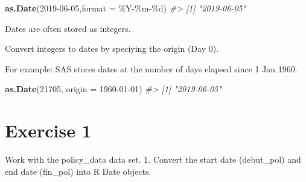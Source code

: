 \documentclass[
]{book}
\newenvironment{Shaded}{\begin{snugshade}}{\end{snugshade}}
\newcommand{\AttributeTok}[1]{\textcolor[rgb]{0.13,0.29,0.53}{#1}}
\newcommand{\CommentTok}[1]{\textcolor[rgb]{0.56,0.35,0.01}{\textit{#1}}}
\newcommand{\DecValTok}[1]{\textcolor[rgb]{0.00,0.00,0.81}{#1}}
\newcommand{\FunctionTok}[1]{\textcolor[rgb]{0.13,0.29,0.53}{\textbf{#1}}}
\newcommand{\NormalTok}[1]{#1}
\newcommand{\StringTok}[1]{\textcolor[rgb]{0.31,0.60,0.02}{#1}}
\begin{document}
\begin{Shaded}
\begin{Highlighting}[]
\FunctionTok{as.Date}\NormalTok{(}\StringTok{\textquotesingle{}2019{-}06{-}05\textquotesingle{}}\NormalTok{,}\AttributeTok{format =} \StringTok{\textquotesingle{}\%Y{-}\%m{-}\%d\textquotesingle{}}\NormalTok{)}
\CommentTok{\#\textgreater{} [1] "2019{-}06{-}05"}
\end{Highlighting}
\end{Shaded}

Dates are often stored as integers.

Convert integers to dates by speciying the origin (Day 0).

For example: SAS stores dates at the number of days elapsed since 1 Jan 1960.

\begin{Shaded}
\begin{Highlighting}[]
\FunctionTok{as.Date}\NormalTok{(}\DecValTok{21705}\NormalTok{, }\AttributeTok{origin =} \StringTok{\textquotesingle{}1960{-}01{-}01\textquotesingle{}}\NormalTok{)}
\CommentTok{\#\textgreater{} [1] "2019{-}06{-}05"}
\end{Highlighting}
\end{Shaded}

\section*{Exercise 1}\label{exercise-1-8}

Work with the policy\_data data set.
1. Convert the start date (debut\_pol) and end date (fin\_pol) into R Date objects.
\end{document}
